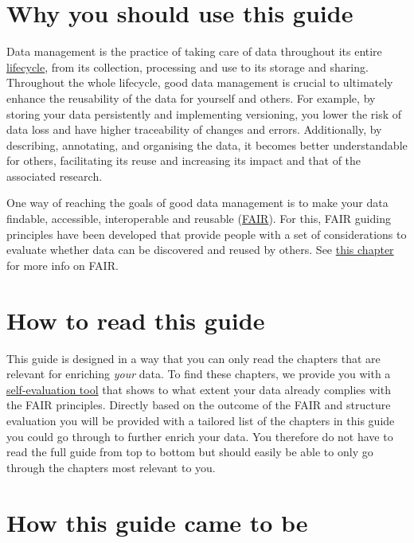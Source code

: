 \documentclass[
]{book}
\begin{document}
\hypertarget{why-you-should-use-this-guide}{%
\section*{Why you should use this guide}\label{why-you-should-use-this-guide}}

Data management is the practice of taking care of data throughout its entire \protect\hyperlink{datalifecycle}{lifecycle}, from its collection, processing and use to its storage and sharing. Throughout the whole lifecycle, good data management is crucial to ultimately enhance the reusability of the data for yourself and others. For example, by storing your data persistently and implementing versioning, you lower the risk of data loss and have higher traceability of changes and errors. Additionally, by describing, annotating, and organising the data, it becomes better understandable for others, facilitating its reuse and increasing its impact and that of the associated research.

One way of reaching the goals of good data management is to make your data findable, accessible, interoperable and reusable (\protect\hyperlink{FAIR}{FAIR}). For this, FAIR guiding principles have been developed that provide people with a set of considerations to evaluate whether data can be discovered and reused by others. See \protect\hyperlink{what-is-fair}{this chapter} for more info on FAIR.

\hypertarget{how-to-read-this-guide}{%
\section*{How to read this guide}\label{how-to-read-this-guide}}

This guide is designed in a way that you can only read the chapters that are relevant for enriching \emph{your} data. To find these chapters, we provide you with a \protect\hyperlink{evaluation}{self-evaluation tool} that shows to what extent your data already complies with the FAIR principles. Directly based on the outcome of the FAIR and structure evaluation you will be provided with a tailored list of the chapters in this guide you could go through to further enrich your data. You therefore do not have to read the full guide from top to bottom but should easily be able to only go through the chapters most relevant to you.

\hypertarget{how-this-guide-came-to-be}{%
\section*{How this guide came to be}\label{how-this-guide-came-to-be}}
\end{document}
